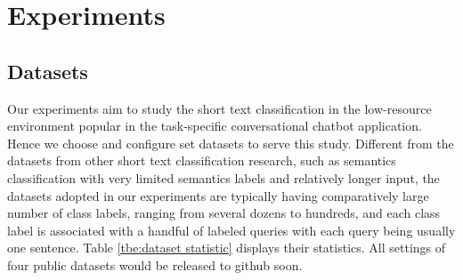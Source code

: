 \section{Experiments}
\label{sec:exp}

\subsection{Datasets}
Our experiments aim to study the short text classification in the low-resource
environment  popular  in  the  task-specific conversational chatbot application.
Hence we choose and configure set datasets to serve this study. Different from
the  datasets from other short text classification research, such as semantics
classification  with  very  limited  semantics labels and relatively longer
input,   the   datasets  adopted  in  our  experiments  are  typically  having
comparatively  large  number  of  class labels, ranging from several dozens to
hundreds,  and  each  class  label  is  associated  with  a handful of labeled
queries with each  query  being usually  one  sentence. Table \ref{tbe:dataset
statistic} displays their statistics.  All settings of four public datasets would 
be released to github soon.

